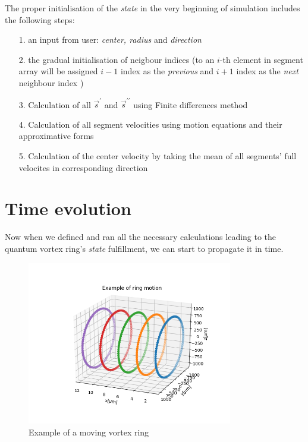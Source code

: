 The proper initialisation of the \textit{state} in the very beginning of simulation includes the following steps:
\begin{itemize}
	\item[1.] an input from user: \textit{center, radius} and \textit{direction}
	\item[2.] the gradual initialisation of neigbour indices (to an $i$-th element in segment array will be assigned $i-1$ index as the \textit{previous} and $i+1$ index as the \textit{next} neighbour index )
	\item[3.] Calculation of all $\vec{s}^{\prime}$ and $\vec{s}^{\prime\prime}$ using Finite differences method
	\item[4.] Calculation of all segment velocities using motion equations and their approximative forms
	\item[5.] Calculation of the center velocity by taking the mean of all segments' full velocites in corresponding direction
\end{itemize}

\newpage

\section{Time evolution}

Now when we defined and ran all the necessary calculations leading to the quantum vortex ring's \textit{state} fulfillment, we can start to propagate it in time.

\begin{figure}[h]
	\centering
	\includegraphics[width=0.8\textwidth]{graphics/simul/time-example}
	\caption{Example of a moving vortex ring}
\end{figure}

